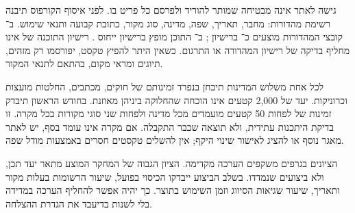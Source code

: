 גישה לאתר אינה מבטיחה שמותר להוריד ולפרסם כל פריט בו. לפני איסוף הקורפוס תיבנה רשימת מהדורות: מחבר, תאריך, שפה, מדינה, סוג מקור, כתובת קבועה ותנאי שימוש. ב־ קובצי המהדורות מוצעים כ־ ברישיון  \cite{mgh_openmgh}; ב־ התוכן מופץ ברישיון ייחוס \cite{pleiades_web}. רישיון התוכנה של  אינו מחליף בדיקה של רישיון המהדורה או התרגום. כשאין היתר להפיץ טקסט, יפורסמו רק מזהים, תיוגים ומראי מקום, בהתאם לתנאי המקור.

לכל אחת משלוש המדינות תיבחן בנפרד זמינותם של חוקים, מכתבים, החלטות מועצות וכרוניקות. יעד של 2,000 קטעים אינו הוכחה שהחלוקה ביניהן מאוזנת. בחודש הראשון תיבדק זמינות של לפחות 50 קטעים מועמדים מכל מדינה ולפחות שני סוגי מקורות בכל מקרה. זו בדיקת היתכנות עתידית, ולא תוצאה שכבר התקבלה. אם מקרה אינו עומד בסף, יש לאתר מאגר נוסף או להציג לאישור שינוי היקף; אין להשלים טקסטים חסרים באמצעות מודל שפה.

הציונים בגרפים משקפים הערכה מקדימה. הציון הגבוה של המחקר המוצע מתאר יעד תכן, ולא ביצועים שנמדדו. בשלב הביצוע ייבדקו הכיסוי בפועל, שיעור הרשומות בעלות מקור ותאריך, שיעור שגיאות הסיווג וזמן השימוש בתוצר. כך יהיה אפשר להחליף הערכה במדידה בלי לשנות בדיעבד את הגדרת ההצלחה.

